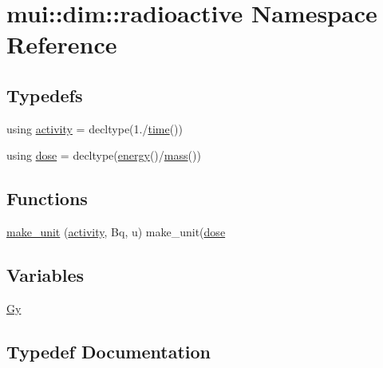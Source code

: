 \hypertarget{namespacemui_1_1dim_1_1radioactive}{}\section{mui\+:\+:dim\+:\+:radioactive Namespace Reference}
\label{namespacemui_1_1dim_1_1radioactive}
\subsection*{Typedefs}
\begin{DoxyCompactItemize}
\item 
using \hyperlink{namespacemui_1_1dim_1_1radioactive_ab65095d53a55c6837149c27823f0b979}{activity} = decltype(1./\hyperlink{namespacemui_1_1dim_a3d3a0014025f1c2c0dd7418791928500}{time}())
\item 
using \hyperlink{namespacemui_1_1dim_1_1radioactive_a809b4779555da397d5d57f8570f7cd17}{dose} = decltype(\hyperlink{namespacemui_1_1dim_a00e1931b1f70586e0983e317bfafb793}{energy}()/\hyperlink{namespacemui_1_1dim_a7b17424f4316e37d7970ee09857ccddf}{mass}())
\end{DoxyCompactItemize}
\subsection*{Functions}
\begin{DoxyCompactItemize}
\item 
\hyperlink{namespacemui_1_1dim_1_1radioactive_ae47c7062a62eb0295c6bb2e3166b068e}{make\+\_\+unit} (\hyperlink{namespacemui_1_1dim_1_1radioactive_ab65095d53a55c6837149c27823f0b979}{activity}, Bq, u) make\+\_\+unit(\hyperlink{namespacemui_1_1dim_1_1radioactive_a809b4779555da397d5d57f8570f7cd17}{dose}
\end{DoxyCompactItemize}
\subsection*{Variables}
\begin{DoxyCompactItemize}
\item 
\hyperlink{namespacemui_1_1dim_1_1radioactive_acd8d69acdc0a03cb550c1a6d648b3e37}{Gy}
\end{DoxyCompactItemize}


\subsection{Typedef Documentation}
\mbox{\label{namespacemui_1_1dim_1_1radioactive_ab65095d53a55c6837149c27823f0b979}} 
